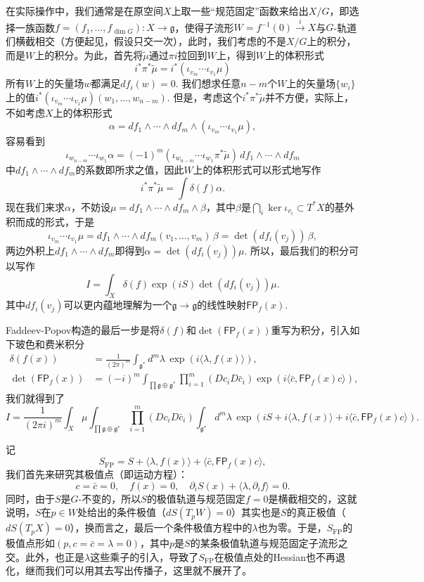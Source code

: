 \documentclass[11pt]{article}
\theoremstyle{definition}
\theoremstyle{plain}
\begin{document}
在实际操作中，我们通常是在原空间$X$上取一些“规范固定”函数来给出$X/G$，即选择一族函数$f=(f_1, \dots, f_{\dim G}):X\to \mathfrak g$，使得子流形$W=f^{-1}(0)\xrightarrow{i} X$与$G$-轨道们横截相交（方便起见，假设只交一次），此时，我们考虑的不是$X/G$上的积分，而是$W$上的积分。为此，首先将$\tilde \mu$通过$\pi i$拉回到$W$上，得到$W$上的体积形式
\[
    i^*\pi^*\tilde \mu=i^*(\iota_{v_m}\cdots \iota_{v_1}\mu)
\]
所有$W$上的矢量场$w$都满足$df_i(w)=0$. 我们想求任意$n-m$个$W$上的矢量场$\{w_i\}$上的值$i^*(\iota_{v_m}\cdots \iota_{v_1}\mu)(w_1,\dots,w_{n-m})$. 但是，考虑这个$i^*\pi^*\tilde \mu$并不方便，实际上，不如考虑$X$上的体积形式
\[
    \alpha=df_1\wedge \cdots \wedge df_m\wedge (\iota_{v_m}\cdots \iota_{v_1}\mu),
\]
容易看到
\[
    \iota_{w_{n-m}}\cdots \iota_{w_1}\alpha=(-1)^{m}(\iota_{w_{n-m}}\cdots \iota_{w_1} \pi^*\tilde \mu)\, df_1\wedge \cdots \wedge df_m
\]
中$df_1\wedge \cdots \wedge df_m$的系数即所求之值，因此$W$上的体积形式可以形式地写作
\[
    i^*\pi^*\tilde \mu=\int \delta(f)\alpha.
\]
现在我们来求$\alpha$，不妨设$\mu=df_1\wedge \cdots \wedge df_m\wedge\beta$，其中$\beta$是$\bigcap_i\ker \iota_{v_i}\subset T^*X$的基外积而成的形式，于是
\[
    \iota_{v_m}\cdots \iota_{v_1}\mu=df_1\wedge \cdots \wedge df_m(v_1,\dots,v_m)\,\beta=\det(df_i(v_j))\,\beta,
\]
两边外积上$df_1\wedge \cdots \wedge df_m$即得到$\alpha=\det(df_i(v_j))\mu$. 所以，最后我们的积分可以写作
\[
    I=\int_{X}\delta(f)\exp(iS)\det(df_i(v_j))\mu.
\]
其中$df_i(v_j)$可以更内蕴地理解为一个$\mathfrak g\to \mathfrak g$的线性映射$\mathsf{FP}_f(x)$.

Faddeev-Popov构造的最后一步是将$\delta(f)$和$\det(\mathsf{FP}_f(x))$重写为积分，引入如下玻色和费米积分
\begin{align*}
    \delta(f(x))&=\frac{1}{(2\pi)^m}\int_{\mathfrak{g}^*}d^m\lambda \,\exp(i\langle \lambda,f(x)\rangle),\\
    \det(\mathsf{FP}_f(x))&=(-i)^m\int_{\prod \mathfrak{g}\oplus \mathfrak{g}^*} \prod_{i=1}^m (Dc_iD\bar c_i) \exp\left(i\langle\bar c,\mathsf{FP}_f(x)c\rangle\right),
\end{align*}
我们就得到了
\[
    I=\frac{1}{(2\pi i)^m}\int_{X}\mu\int_{\prod \mathfrak{g}\oplus \mathfrak{g}^*} \prod_{i=1}^m (Dc_iD\bar c_i)\int_{\mathfrak{g}^*}d^m\lambda \,\exp(iS+i\langle \lambda,f(x)\rangle+i\langle\bar c,\mathsf{FP}_f(x)c\rangle).
\]

记
\[
    S_{\text{FP}}=S+\langle \lambda,f(x)\rangle+\langle\bar c,\mathsf{FP}_f(x)c\rangle,
\]
我们首先来研究其极值点（即运动方程）：
\[
    c=\bar c=0,\quad f(x)=0,\quad \partial_i S(x)+\langle \lambda,\partial_i f\rangle=0.
\]
同时，由于$S$是$G$-不变的，所以$S$的极值轨道与规范固定$f=0$是横截相交的，这就说明，$S$在$p\in W$处给出的条件极值（$dS(T_pW)=0$）其实也是$S$的真正极值（$dS(T_pX)=0$），换而言之，最后一个条件极值方程中的$\lambda$也为零。于是，$S_{\text{FP}}$的极值点形如$(p,c=\bar c=\lambda=0)$，其中$p$是$S$的某条极值轨道与规范固定子流形之交。此外，也正是$\lambda$这些乘子的引入，导致了$S_{\text{FP}}$在极值点处的Hessian也不再退化，继而我们可以用其去写出传播子，这里就不展开了。
\end{document}

